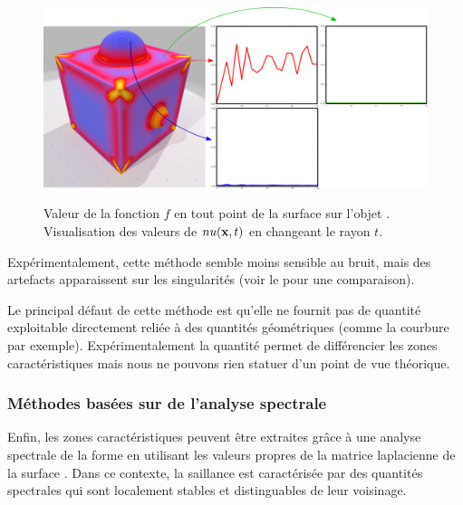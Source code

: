 \begin{figure}[ht]{
  \begin{center}
    \includegraphics[height=6cm]{figures/CubeSpherePlotMellado}
  \end{center}}
  \caption[Valeur de la fonction $f$ en tout point de la surface sur
  l'objet \CubeSphere.]{Valeur de la fonction $f$ en tout point de la surface sur
  l'objet \CubeSphere. Visualisation des valeurs de $nu(\mathbf{x},t)$ en changeant le
  rayon $t$. \label{fig:mellado-cubesphere}}
\end{figure}

Expérimentalement, cette méthode semble moins sensible au bruit, mais des
artefacts apparaissent sur les singularités (voir le
 pour une comparaison).


Le principal défaut de cette méthode est qu'elle ne fournit pas de quantité
exploitable directement reliée à des quantités géométriques (comme la courbure
par exemple). Expérimentalement la quantité permet de différencier les zones
caractéristiques mais nous ne pouvons rien statuer d'un point de vue théorique.
%
\subsubsection{Méthodes basées sur de l'analyse spectrale}%
\label{sec:applications:feature:spectral}
%
Enfin, les zones caractéristiques peuvent être extraites grâce à une analyse
spectrale de la forme en utilisant les valeurs propres de la matrice laplacienne
de la surface \cite{GebalBAL09,Sun2009,Song2014}. Dans ce contexte, la saillance
est caractérisée par des quantités spectrales qui sont localement stables et
distinguables de leur voisinage.
%
